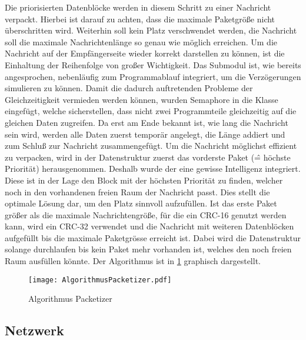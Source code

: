 Die priorisierten Datenbl{\"o}cke werden in diesem Schritt zu einer Nachricht
verpackt. Hierbei ist darauf zu achten, dass die maximale Paketgr{\"o}{\ss}e
nicht {\"u}berschritten wird. Weiterhin soll kein Platz verschwendet werden,
\dahe die Nachricht soll die maximale Nachrichtenl{\"a}nge so genau wie
m{\"o}glich erreichen.
Um die Nachricht auf der Empf{\"a}ngerseite wieder korrekt darstellen zu k{\"o}nnen, ist
die Einhaltung der Reihenfolge von gro{\ss}er Wichtigkeit. \newline
Das Submodul ist, wie bereits angesprochen, nebenl{\"a}ufig zum Programmablauf
integriert, um die Verz{\"o}gerungen simulieren zu k{\"o}nnen. Damit die
dadurch auftretenden Probleme der Gleichzeitigkeit vermieden werden k{\"o}nnen,
wurden Semaphore in die Klasse 
eingef{\"u}gt, welche sicherstellen, dass nicht zwei Programmteile gleichzeitig auf
die gleichen Daten zugreifen. Da erst am Ende bekannt ist, wie lang die
Nachricht sein wird, werden alle Daten zuerst tempor{\"a}r angelegt, die
L{\"a}nge addiert und zum Schlu{\ss} zur Nachricht zusammengef{\"u}gt.
Um die Nachricht m{\"o}glichst effizient zu verpacken, wird in der
Datenstruktur  zuerst das vorderste Paket
(\^= h{\"o}chste Priorit{\"a}t) herausgenommen. Deshalb wurde der
 eine gewisse Intelligenz integriert.
Diese ist in der Lage den Block mit der h{\"o}chsten Priorit{\"a}t zu finden, welcher
noch in den vorhandenen freien Raum der Nachricht passt. Dies stellt die
optimale L{\"o}sung dar, um den Platz sinnvoll aufzuf{\"u}llen. \newline 
Ist das erste Paket gr{\"o}{\ss}er als die maximale Nachrichtengr{\"o}{\ss}e,
f{\"u}r die ein CRC-16 genutzt werden kann, wird ein CRC-32 verwendet und die Nachricht mit weiteren
Datenbl{\"o}cken aufgef{\"u}llt bis die maximale Paketgr{\"o}sse erreicht ist. Dabei wird
die Datenstruktur  solange
durchlaufen bis kein Paket mehr vorhanden ist, welches den noch freien Raum
ausf{\"u}llen k{\"o}nnte. \newline 
Der Algorithmus ist in \ref{fig:AlgorithmusPacketizer} graphisch dargestellt.

\begin{figure}[H]
\centering
\texttt{[image: AlgorithmusPacketizer.pdf]}
\caption{Algorithmus Packetizer}
\label{fig:AlgorithmusPacketizer}
\end{figure}

\subsection{Netzwerk}

